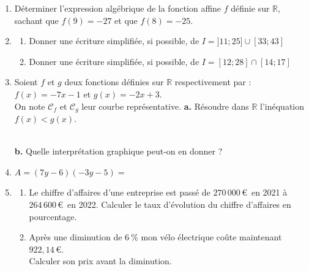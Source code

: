 \documentclass[a4paper,11pt]{article}
\begin{document}
\begin{seance}{}%
\begin{enumerate}
\item  Déterminer l'expression algébrique de la fonction affine $f$ définie sur $\mathbb R$, sachant que $f(9)=-27$ et que $f(8)=-25$.\dotfill

\dotfill

\dotfill

\item \begin{enumerate}
	\item \begin{minipage}[t]{\linewidth} Donner une écriture simplifiée, si possible, de $I=]11;25]\cup[33;43]$ \dotfill \end{minipage}
	\item \begin{minipage}[t]{\linewidth} Donner une écriture simplifiée, si possible, de $I=[12;28] \cap [14;17]$ \dotfill \end{minipage}
\end{enumerate}


\item  Soient $f$ et $g$ deux fonctions définies sur $\mathbb R$ respectivement par : $f(x)=-7x-1$ et $g(x)=-2x+3$. \\
              On note $\mathscr{C}_f$ et $\mathscr{C}_g$ leur courbe représentative. \textbf {a.}  Résoudre dans $\mathbb R$ l'inéquation $f(x) < g(x)$.
              
              \dotfill
              
              \dotfill
              
              \dotfill \\
          \textbf {b.}  Quelle interprétation graphique peut-on en donner ? \dotfill


\item $A = (7y-6)(-3y-5)=$\dotfill


\item \begin{enumerate}
	\item Le chiffre d'affaires d'une entreprise est passé de $270\,000$\,\euro{}~en 2021 à $264\,600$\,\euro{}~en 2022. \dotfill
       Calculer le taux d'évolution du chiffre d'affaires en pourcentage.
       
       \dotfill
	\item Après une diminution de $6~\%$ mon vélo électrique coûte maintenant $922{,}14$\,\euro{}. \\
	Calculer son prix avant la diminution. 
	
	\dotfill
\end{enumerate}


\end{enumerate}
\end{seance}
\end{document}
